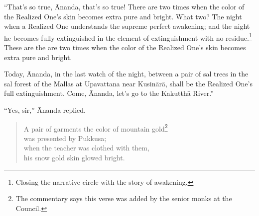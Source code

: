\documentclass[12pt,openany]{book}%
\begin{document}
“That’s so true, Ānanda, that’s so true! There are two times when the color of the Realized One’s skin becomes extra pure and bright. What two? The night when a Realized One understands the supreme perfect awakening; and the night he becomes fully extinguished in the element of extinguishment with no residue.\footnote{Closing the narrative circle with the story of awakening. } These are the are two times when the color of the Realized One’s skin becomes extra pure and bright. 

Today, Ānanda, in the last watch of the night, between a pair of sal trees in the sal forest of the Mallas at Upavattana near \textsanskrit{Kusinārā}, shall be the Realized One’s full extinguishment. Come, Ānanda, let’s go to the \textsanskrit{Kakutthā} River.” 

“Yes, sir,” Ānanda replied. 

\begin{verse}%
A pair of garments the color of mountain gold\footnote{The commentary says this verse was added by the senior monks at the Council. } \\
was presented by Pukkusa; \\
when the teacher was clothed with them, \\
his snow gold skin glowed bright. 

%
\end{verse}
\end{document}
